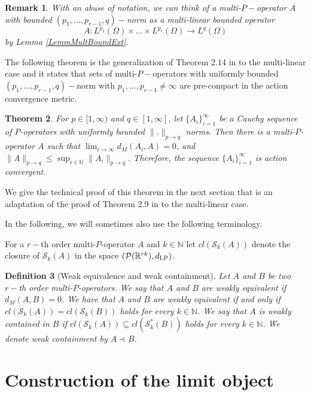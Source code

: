 \documentclass[11pt]{article}
\newtheorem{theorem}{Theorem}[section]
\newtheorem{definition}[theorem]{Definition}
\newtheorem{remark}[theorem]{Remark}
\begin{document}
\begin{remark}
    With an abuse of notation, we can think of a multi-$P-$operator $A$ with bounded $(p_1,\ldots,p_{r-1},q)-$norm as a multi-linear bounded operator $$A:L^{p_1}(\Omega)\times \ldots \times L^{p_r}(\Omega)\rightarrow L^{q}(\Omega)$$ by Lemma \ref{LemmMultBoundExt}.
\end{remark}

The following theorem is the generalization of Theorem 2.14 in \cite{backhausz2018action} to the multi-linear case and it states that sets of multi-$P-$operators with uniformly bounded $(p_1,\ldots,p_{r-1},q)-$norm with $p_1,\ldots,p_{r-1}\neq \infty$ are pre-compact in the action convergence metric.

\begin{theorem} \label{CompactnesMultiActConv} For $p\in [1,\infty)$ and $q\in [1,\infty]$, let $\{A_i\}_{i=1}^\infty$ be a Cauchy sequence of $P$-operators with uniformly bounded $\|.\|_{p\to q}$ norms. Then there is a multi-$P$-operator $A$ such that $\lim_{i\to\infty} d_M(A_i,A)=0$, and $\|A\|_{p\to q}\leq\sup_{i\in\mathbb{N}}\|A_i\|_{p\to q}$. Therefore, the sequence $\{A_i\}_{i=1}^\infty$ is action convergent. 
\end{theorem}

We give the technical proof of this theorem in the next section that is an adaptation of the proof of Theorem 2.9 in \cite{backhausz2018action} to the multi-linear case.

In the following, we will sometimes also use the following terminology.

For a $r-$th order multi-$P$-operator $A$ and $k\in\mathbb{N}$ let $cl(\mathcal{S}_k(A))$ denote the closure of $\mathcal{S}_k(A)$ in the space $(\mathcal{P}(\mathbb{R}^{rk}),d_{\rm LP})$.

\begin{definition} [Weak equivalence and weak containment] Let $A$ and $B$ be two $r-$th order multi-$P$-operators. We say that $A$ and $B$ are  weakly equivalent if $d_M(A,B)=0$. We have that $A$ and $B$ are weakly equivalent if and only if $cl(\mathcal{S}_k(A))=cl(\mathcal{S}_k(B))$ holds for every $k\in\mathbb{N}$. We say that $A$ is weakly contained in $B$ if $cl(\mathcal{S}_k(A))\subseteq cl(\mathcal{S}_k^*(B))$ holds for every $k\in\mathbb{N}$. We denote weak containment by $A\prec B$.
\end{definition}

\section{Construction of the limit object}\label{SecConstrLimObj}
\end{document}
